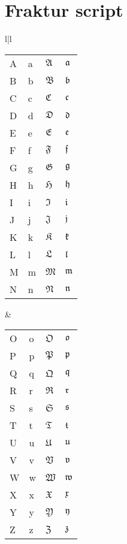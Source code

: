 \section{Fraktur script}
\begin{tabular}{l|l}
\begin{tabular}[t]{l@{\hskip 2pt}ll@{\hskip 2pt}l}
A & a & $\mathfrak A$ & $\mathfrak a$\\
B & b & $\mathfrak B$ & $\mathfrak b$ \\
C & c & $\mathfrak C$ & $\mathfrak c$\\
D & d & $\mathfrak D$ & $\mathfrak d$\\
\noalign{\vspace{1em}}
E & e & $\mathfrak E$ & $\mathfrak e$\\
F & f & $\mathfrak F$ & $\mathfrak f$\\
G & g & $\mathfrak G$ & $\mathfrak g$\\
H & h & $\mathfrak H$ & $\mathfrak h$\\
\noalign{\vspace{1em}}
I & i & $\mathfrak I$ & $\mathfrak i$\\
J & j & $\mathfrak J$ & $\mathfrak j$\\
K & k & $\mathfrak K$ & $\mathfrak k$\\
L & l & $\mathfrak L$ & $\mathfrak l$\\
\noalign{\vspace{1em}}
M & m & $\mathfrak M$ & $\mathfrak m$\\
N & n & $\mathfrak N$ & $\mathfrak n$
\end{tabular}
&
\begin{tabular}[t]{l@{\hskip 2pt}ll@{\hskip 2pt}l}
O & o & $\mathfrak O$ & $\mathfrak o$\\
P & p & $\mathfrak P$ & $\mathfrak p$\\
Q & q & $\mathfrak Q$ & $\mathfrak q$\\
R & r & $\mathfrak R$ & $\mathfrak r$\\
\noalign{\vspace{1em}}
S & s & $\mathfrak S$ & $\mathfrak s$\\
T & t & $\mathfrak T$ & $\mathfrak t$\\
U & u & $\mathfrak U$ & $\mathfrak u$\\
V & v & $\mathfrak V$ & $\mathfrak v$\\
\noalign{\vspace{1em}}
W & w & $\mathfrak W$ & $\mathfrak w$\\
X & x & $\mathfrak X$ & $\mathfrak x$\\
Y & y & $\mathfrak Y$ & $\mathfrak y$\\
Z & z & $\mathfrak Z$ & $\mathfrak z$
\end{tabular}
\end{tabular}

